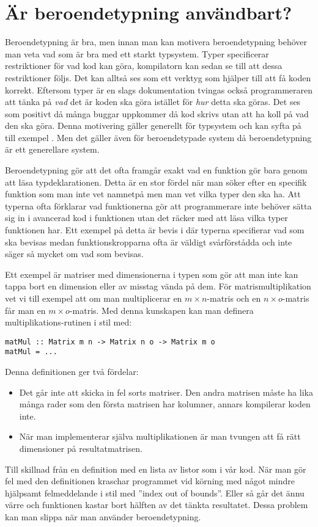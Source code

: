 \section{Är beroendetypning användbart?}
Beroendetypning är bra, men innan man kan motivera beroendetypning behöver man
veta vad som är bra med ett starkt typsystem.
Typer specificerar restriktioner för vad kod kan göra, kompilatorn kan sedan se
till att dessa restriktioner följs. Det kan alltså ses som ett verktyg som
hjälper till att få koden korrekt. Eftersom typer är en slags dokumentation
tvingas också programmeraren att tänka på
\emph{vad} det är koden ska göra istället för \emph{hur} detta ska göras. Det
ses som positivt då många buggar uppkommer då kod skrivs utan att ha koll på
vad den ska göra. Denna motivering gäller generellt för typsystem och kan syfta
på till exempel \haskell{}. Men det gäller även för beroendetypade system då
beroendetypning är ett generellare system.

Beroendetypning gör att det ofta framgår exakt vad en funktion gör bara genom
att läsa typdeklarationen. Detta är en stor fördel när man söker efter en
specifik funktion som man inte vet namnetpå men man vet vilka typer den ska ha.
Att typerna ofta förklarar vad funktionerna gör att programmerare inte behöver
sätta sig in i avancerad kod i funktionen utan det räcker med att läsa vilka
typer funktionen har. Ett exempel på detta är bevis i \coq{} där typerna
specifierar vad som ska bevisas medan funktionskropparna ofta är väldigt
svårförstådda och inte säger så mycket om vad som bevisas.

Ett exempel är matriser med dimensionerna i typen som gör att man inte kan
tappa bort en dimension eller av misstag vända på dem. För matrismultiplikation
vet vi till exempel att om man multiplicerar en $m \times n$-matris och en
$n \times o$-matris får man en $m \times o$-matris. Med denna kunskapen kan
man definera multiplikations-rutinen i stil med:

\begin{verbatim}
matMul :: Matrix m n -> Matrix n o -> Matrix m o
matMul = ...
\end{verbatim}

Denna definitionen ger två fördelar:

\begin{itemize}
  \item Det går inte att skicka in fel sorts matriser. Den andra matrisen måste
    ha lika många rader som den första matrisen har kolumner, annars kompilerar
    koden inte.
  \item När man implementerar själva multiplikationen är man tvungen att få rätt
    dimensioner på resultatmatrisen.
\end{itemize}

Till skillnad från en definition med en lista av listor som i vår \haskell{} kod.
När man gör fel med den definitionen kraschar programmet vid körning med något
mindre hjälpsamt felmeddelande i stil med ''index out of bounds''. Eller så går
det ännu värre och funktionen kastar bort hälften av det tänkta resultatet.
Dessa problem kan man slippa när man använder beroendetypning.
